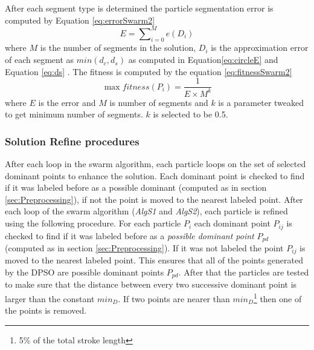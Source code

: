 After each segment type is determined the particle segmentation error is computed by Equation \ref{eq:errorSwarm2} 
\begin{equation}
E=\sum\nolimits_{i = 0}^M e(D_i) 
\label{eq:errorSwarm2}
\end{equation}
where $M$ is the number of segments in the solution, $D_i$ is the  approximation error of each segment as $min(d_c,d_s)$ as computed in Equation\ref{eq:circleE}  and Equation \ref{eq:ds} \cite{CruveDivisionSwarm}. The fitness is computed by the equation \ref{eq:fitnessSwarm2} 
\begin{equation}
\max fitness(P_i ) = \frac{1}{{E \times M^k }}
\label{eq:fitnessSwarm2}
\end{equation} where $E$ is the error and $M$ is number of segments and $k$ is a parameter tweaked to get minimum number of segments. $k$ is selected to be 0.5\cite{CruveDivisionSwarm}. 

\subsubsection{Solution Refine procedures} 
 After each loop in the swarm algorithm, each particle loops on the set of selected dominant points to enhance the solution. Each dominant point is checked to find if it was labeled before as a possible dominant (computed as in section \ref{sec:Preprocessing}), if not the point is moved to the nearest labeled point.
   After each loop of the swarm algorithm (\textsl{AlgS1} and \textsl{AlgS2}), each particle is refined using the following procedure. For each particle $P_i$ each dominant point $P_{ij}$ is checked to find if it was labeled before as a \textit{possible dominant point} $P_{pd}$ (computed as in section \ref{sec:Preprocessing}). If it was not labeled the point $P_{ij}$ is moved to the nearest labeled point. This ensures that all of the points generated by the DPSO are possible dominant points $P_{pd}$. After that the particles are tested to make sure that the distance between every two successive dominant point is larger than the constant $min_D$. If two points are nearer than $min_D$\footnote{ 5\% of the total stroke length} then one of the points is removed. 
   
